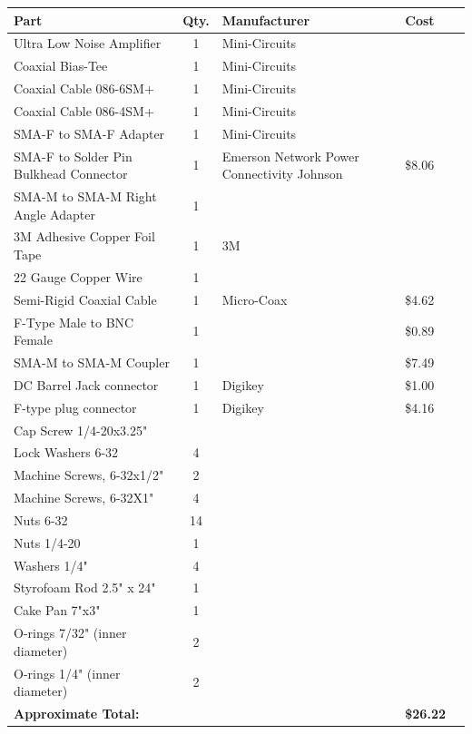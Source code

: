 \documentclass[11pt]{article} %
\begin{document}
\begin{tabular}{| p{6cm} | c | p{5cm} | l | c |}
\hline
\textbf{Part} & \textbf{Qty.} & \textbf{Manufacturer} & \textbf{Cost} \\ \hline \hline
Ultra Low Noise Amplifier & 1 & Mini-Circuits & \\ \hline
Coaxial Bias-Tee & 1 & Mini-Circuits & \\ \hline
Coaxial Cable 086-6SM+ & 1 & Mini-Circuits & \\ \hline
Coaxial Cable 086-4SM+ & 1 & Mini-Circuits & \\ \hline
SMA-F to SMA-F Adapter & 1 & Mini-Circuits & \\ \hline
SMA-F to Solder Pin Bulkhead Connector & 1 & Emerson Network Power Connectivity Johnson & \$8.06 \\ \hline
SMA-M to SMA-M Right Angle Adapter & 1 & & \\ \hline
3M Adhesive Copper Foil Tape & 1 & 3M & \\ \hline
22 Gauge Copper Wire & 1 & & \\ \hline
Semi-Rigid Coaxial Cable & 1 & Micro-Coax & \$4.62 \\ \hline
F-Type Male to BNC Female & 1 & & \$0.89 \\ \hline
SMA-M to SMA-M Coupler & 1 & & \$7.49\\ \hline
DC Barrel Jack connector & 1 & Digikey & \$1.00  \\ \hline
F-type plug connector & 1& Digikey & \$4.16  \\ \hline
Cap Screw 1/4-20x3.25" & & & \\ \hline 
Lock Washers 6-32 & 4 & & \\ \hline
Machine Screws, 6-32x1/2" & 2 & & \\ \hline
Machine Screws, 6-32X1" & 4 & & \\ \hline
Nuts 6-32 & 14 & & \\ \hline
Nuts 1/4-20 & 1 & & \\ \hline
Washers 1/4" & 4 & & \\ \hline
Styrofoam Rod 2.5" x 24" & 1 & & \\ \hline
Cake Pan 7"x3" & 1 & & \\ \hline
O-rings 7/32" (inner diameter) & 2 & & \\ \hline
O-rings 1/4" (inner diameter) & 2 & & \\ \hline
\textbf{Approximate Total:} & & & \textbf{\$26.22} \\ \hline
\end{tabular}
\end{document}

